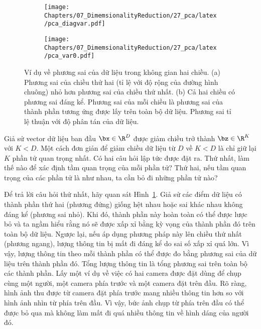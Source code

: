  \begin{figure}[t]
     \begin{subfigure}{0.59\textwidth}
     \texttt{[image: Chapters/07\_DimemsionalityReduction/27\_pca/latex/pca\_diagvar.pdf]}
     \caption{}
     \label{fig:pca_2a}
     \end{subfigure}
     \begin{subfigure}{0.33\textwidth}
     \texttt{[image: Chapters/07\_DimemsionalityReduction/27\_pca/latex/pca\_var0.pdf]}
     \caption{}
     \label{fig:pca_2b}
     \end{subfigure}
     \caption{Ví dụ về phương sai của dữ liệu trong không gian hai chiều. (a)
     Phương sai của chiều thử hai (tỉ lệ với độ rộng của đường hình chuông) nhỏ
     hơn phương sai của chiều thứ nhất. (b) Cả hai chiều có phương sai đáng kể. Phương sai của
     mỗi chiều là phương sai của thành phần tương ứng được lấy trên toàn bộ dữ
     liệu. Phương sai tỉ lệ thuận với độ phân tán của dữ liệu.}
     \label{fig:pca_2}
 \end{figure}

Giả sử vector dữ liệu ban đầu $\bx \in \R^{D}$ được giảm chiều trở thành $\bz
\in \R^K$ với $K < D$. Một cách đơn giản để giảm chiều dữ liệu từ $D$ về $K < D$ là chỉ giữ lại $K$ phần tử {quan trọng nhất}. Có hai câu hỏi lập tức
được đặt ra. Thứ nhất, làm thế nào để xác định {tầm quan trọng} của
mỗi phần tử? Thứ hai, nếu tầm quan trọng của các phần tử là như
nhau, ta cần bỏ đi những phần tử nào?

Để trả lời câu hỏi thứ nhất, hãy quan sát Hình~\ref{fig:pca_2a}. Giả sử các
điểm dữ liệu có thành phần thứ hai (phương đứng) giống hệt nhau hoặc sai khác
nhau không đáng kể (phương sai nhỏ). Khi đó, thành phần này hoàn toàn có thể được lược
bỏ và ta ngầm hiểu rằng nó sẽ được xấp xỉ bằng kỳ vọng của thành phần đó
trên toàn bộ dữ liệu. Ngược lại, nếu áp dụng phương pháp này lên chiều thứ nhất (phương ngang), {lượng thông tin} bị mất đi đáng kể do sai số xấp xỉ quá lớn. Vì vậy, lượng thông tin theo mỗi thành phần có thể được đo bằng phương sai của dữ liệu trên thành phần đó. Tổng lượng
thông tin là tổng phương sai trên toàn bộ các thành phần. Lấy
một ví dụ về việc có hai camera được đặt dùng để chụp cùng một người, một camera
phía trước và một camera đặt trên đầu. Rõ ràng, hình ảnh thu được từ
camera đặt phía trước mang nhiều thông tin hơn so với hình ảnh nhìn từ
phía trên đầu. Vì vậy, bức ảnh chụp từ phía trên đầu có thể được bỏ qua mà không
làm mất đi quá nhiều thông tin về hình dáng của người đó.


